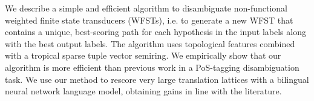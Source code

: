 We describe a simple and efficient algorithm to disambiguate non-functional weighted finite state transducers (WFSTs), i.e. to generate a new WFST that contains a unique, best-scoring path for each hypothesis in the input labels along with the best output labels. The algorithm uses topological features combined with a tropical sparse tuple vector semiring. We empirically show that our algorithm is more efficient than previous work in a PoS-tagging disambiguation task.  We use our method to rescore very large translation lattices with a bilingual neural network language model, obtaining gains in line with the literature.
